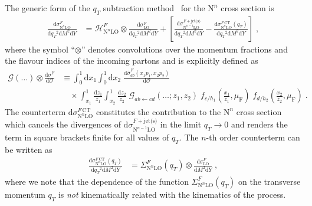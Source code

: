 \documentclass[12pt]{article}
\DeclareRobustCommand{\muf}{\ensuremath{\mu_{\mathrm{F}}}\xspace}
\DeclareRobustCommand{\qt}{\ensuremath{q_T}\xspace}
\DeclareRobustCommand{\rd}{\ensuremath{\mathrm{d}}}
\DeclareRobustCommand{\cO}{\ensuremath{\mathcal{O}}}
\DeclareRobustCommand{\cG}{\ensuremath{\mathcal{G}}}
\DeclareRobustCommand{\cH}{\ensuremath{\mathcal{H}}}
\DeclareRobustCommand{\obs}{\cO\xspace}
\DeclareRobustCommand{\jets}{\text{jet(s)}\xspace}
\DeclareRobustCommand{\CT}{\text{CT}\xspace}
\DeclareRobustCommand{\LO}{\text{LO}\xspace}
\DeclareRobustCommand{\N}[1]{\ensuremath{\text{N}^{#1}}} %
\begin{document}
The generic form of the $\qt$ subtraction method~\cite{Catani:2007vq} for the \N{n}\LO cross section is
\begin{align}
  \frac{\rd\sigma^{F}_{\N{n}\LO}}{\rd\qt^2\rd M^2\rd Y}
  &=
  \cH^F_{\N{n}\LO} \otimes
  \frac{\rd\sigma^{F}_{\LO}}{\rd\qt^2\rd M^2\rd Y} +
  \left[ 
    \frac{\rd\sigma^{F+\jets}_{\N{n-1}\LO}}{\rd\qt^2\rd M^2\rd Y} -
    \frac{\rd\sigma^{F\,\CT}_{\N{n}\LO}(\qt)}{\rd\qt^2\rd M^2\rd Y}
  \right] \;,
  \label{eq:master}
\end{align}
where the symbol ``$\otimes$'' denotes convolutions over the momentum fractions and the flavour indices of the incoming partons and is explicitly defined as
\begin{align}
  \cG(\dots) \otimes \frac{\rd\sigma^{F}}{\rd\obs} 
  &\equiv
  \int_0^1\rd x_1 \int_0^1\rd x_2 \;
  \frac{\rd\hat{\sigma}^{F}_{ab}(x_1 p_1, x_2 p_2)}{\rd\obs}
  \nonumber\\&\quad
  \times 
  \int_{x_1}^1 \frac{\rd z_1}{z_1} \int_{x_2}^1 \frac{\rd z_2}{z_2} \; 
  \cG_{ab \gets cd}(\ldots; z_1, z_2) \;
  f_{c/h_1}\left(\frac{x_1}{z_1},\muf\right) \; f_{d/h_2}\left(\frac{x_2}{z_2},\muf\right) \;.
\end{align}
The counterterm $\rd\sigma^{F\,\CT}_{\N{n}\LO}$ constitutes the contribution to the \N{n}\LO cross section which cancels the divergences of $\rd\sigma^{F+\jets}_{\N{n-1}\LO}$ in the limit $\qt \rightarrow 0$ and renders the term in square brackets finite for all values of $\qt$. 
The $n$-th order counterterm can be written as
\begin{align}
  \frac{\rd\sigma^{F\,\CT}_{\N{n}\LO}(\qt)}{\rd\qt^2\rd M^2\rd Y}
  &=
  \Sigma^F_{\N{n}\LO}(\qt) \otimes
  \frac{\rd\sigma^{F}_{\LO}}{\rd M^2\rd Y} \;,
  \label{eq:CT}
\end{align}
where we note that the dependence of the function $\Sigma^{F}_{\N{n}\LO}(\qt)$ on the transverse momentum $\qt$ is \emph{not} kinematically related with the kinematics of the process.
\end{document}
